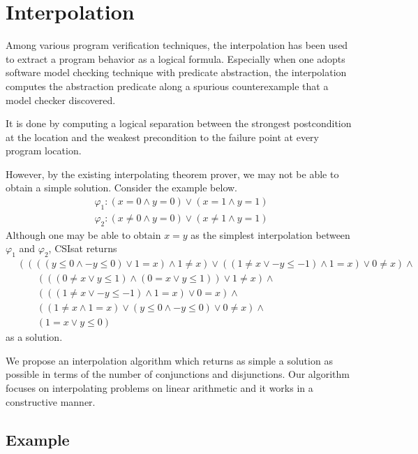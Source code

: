 \chapter{Interpolation}
\label{chap:interpolation}

Among various program verification techniques, the interpolation has
been used to extract a program behavior as a logical formula.
Especially when one adopts software model checking technique with
predicate abstraction, the interpolation computes the abstraction
predicate along a spurious counterexample that a model checker
discovered.

It is done by computing a logical separation between the strongest
postcondition at the location and the weakest precondition to the
failure point at every program location.

However, by the existing interpolating theorem prover, we may not be
able to obtain a simple solution.  Consider the example below.
\begin{align*}
\varphi_1 : (x = 0 \wedge y = 0) \vee (x = 1 \wedge y = 1) \\
\varphi_2 : (x \neq 0 \wedge y = 0) \vee (x \neq 1 \wedge y = 1)
\end{align*}
Although one may be able to obtain $x = y$ as the simplest
interpolation between $\varphi_1$ and $\varphi_2$,
CSIsat\cite{conf/cav/BeyerZM08} returns
\begin{align*}
& ((((y \leq 0 \wedge -y \leq 0) \vee 1 = x) \wedge 1 \neq x) \vee ((1 \neq x \vee -y \leq -1) \wedge 1 = x) \vee 0 \neq x) \wedge \\
& \qquad (((0 \neq x \vee y \leq 1) \wedge (0 = x \vee y \leq 1)) \vee 1 \neq x) \wedge \\
& \qquad (((1 \neq x \vee -y \leq -1) \wedge 1 = x) \vee 0 = x) \wedge \\
& \qquad ((1 \neq x \wedge 1 = x) \vee (y \leq 0 \wedge -y \leq 0) \vee 0 \neq x) \wedge \\
& \qquad (1 = x \vee y \leq 0)
\end{align*}
as a solution.

We propose an interpolation algorithm which returns as simple a
solution as possible in terms of the number of conjunctions and
disjunctions.  Our algorithm focuses on interpolating problems on
linear arithmetic and it works in a constructive manner.


\section{Example}


